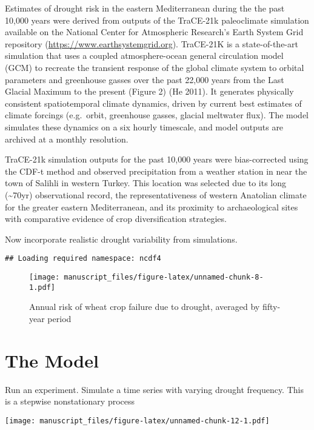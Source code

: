 \documentclass[smallextended]{svjour3}       %
\begin{document}
Estimates of drought risk in the eastern Mediterranean during the the
past 10,000 years were derived from outputs of the TraCE-21k
paleoclimate simulation available on the National Center for Atmospheric
Research's Earth System Grid repository
(\url{https://www.earthsystemgrid.org}). TraCE-21K is a state-of-the-art
simulation that uses a coupled atmosphere-ocean general circulation
model (GCM) to recreate the transient response of the global climate
system to orbital parameters and greenhouse gasses over the past 22,000
years from the Last Glacial Maximum to the present (Figure 2) (He 2011).
It generates physically consistent spatiotemporal climate dynamics,
driven by current best estimates of climate forcings (e.g.~orbit,
greenhouse gasses, glacial meltwater flux). The model simulates these
dynamics on a six hourly timescale, and model outputs are archived at a
monthly resolution.

TraCE-21k simulation outputs for the past 10,000 years were
bias-corrected using the CDF-t method and observed precipitation from a
weather station in near the town of Salihli in western Turkey. This
location was selected due to its long (\textasciitilde{}70yr)
observational record, the representativeness of western Anatolian
climate for the greater eastern Mediterranean, and its proximity to
archaeological sites with comparative evidence of crop diversification
strategies.

Now incorporate realistic drought variability from simulations.

\begin{verbatim}
## Loading required namespace: ncdf4
\end{verbatim}

\begin{figure}
\centering
\texttt{[image: manuscript\_files/figure-latex/unnamed-chunk-8-1.pdf]}
\caption{Annual risk of wheat crop failure due to drought, averaged by
fifty-year period}
\end{figure}

\hypertarget{the-model}{%
\section{The Model}\label{the-model}}

Run an experiment. Simulate a time series with varying drought
frequency. This is a stepwise nonstationary process

\texttt{[image: manuscript\_files/figure-latex/unnamed-chunk-12-1.pdf]}
\end{document}

